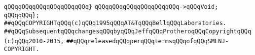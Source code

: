 \verb|qQQqqQQqqQQqqQQqqQQqqQQq}|\newline
\verb|qQQqqQQqqQQqqQQqqQQqqQQq->qQQqVoid;|\newline
\verb|qQQqqQQq};|\newline
\newline
\newline
\newline
\verb|##qQQqCOPYRIGHTqQQq(c)qQQq1995qQQqAT&TqQQqBellqQQqLaboratories.|\newline
\verb|##qQQqSubsequentqQQqchangesqQQqbyqQQqJeffqQQqProtheroqQQqCopyrightqQQq(c)qQQq2010-2015,|\newline
\verb|##qQQqreleasedqQQqperqQQqtermsqQQqofqQQqSMLNJ-COPYRIGHT.|\newline

